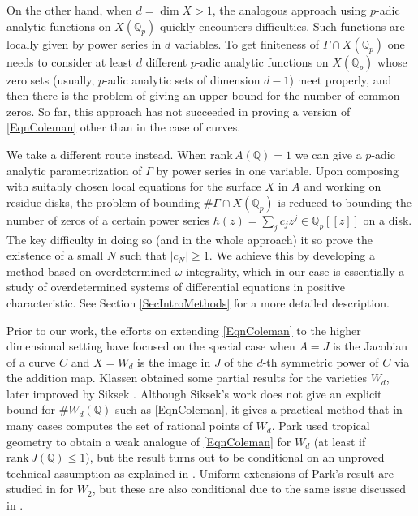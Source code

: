 \documentclass[11pt]{amsart}
\theoremstyle{remark}
\numberwithin{equation}{section}
\newcommand{\Q}{\mathbb{Q}}
\newcommand{\rk}{\mathrm{rank}\,}
\begin{document}
On the other hand, when $d=\dim X>1$, the analogous approach using $p$-adic analytic functions on $X(\Q_p)$ quickly encounters difficulties. Such functions are locally given by power series in $d$ variables. To get finiteness of $\Gamma\cap X(\Q_p)$ one needs to consider at least $d$ different $p$-adic analytic functions on $X(\Q_p)$ whose zero sets (usually, $p$-adic analytic sets of dimension $d-1$) meet properly, and then there is the problem of giving an upper bound for the number of common zeros. So far, this approach has not succeeded in proving a version of \eqref{EqnColeman} other than in the case of curves.

We take a different route instead. When $\rk A(\Q)=1$ we can give a $p$-adic analytic parametrization of $\Gamma$ by power series in one variable. Upon composing with suitably chosen local equations for the surface $X$ in $A$ and working on residue disks, the problem of bounding $\# \Gamma\cap X(\Q_p)$ is reduced to bounding the number of zeros of a certain power series $h(z)=\sum_j c_jz^j\in \Q_p[[z]]$ on a disk. The key difficulty in doing so (and in the whole approach) it so prove the existence of a small $N$ such that $|c_N|\ge 1$.  We achieve this by developing a method based on overdetermined $\omega$-integrality, which in our case is essentially a study of overdetermined systems of differential equations in positive characteristic. See Section \ref{SecIntroMethods} for a more detailed description.






Prior to our work, the efforts on extending \eqref{EqnColeman} to the higher dimensional setting  have focused on the special case when $A=J$ is the Jacobian of a curve $C$  and $X=W_d$ is the image in $J$ of the $d$-th symmetric power of $C$ via the addition map.  Klassen \cite{Klassen} obtained some partial results for the varieties $W_d$, later improved by Siksek \cite{Siksek}. Although Siksek's work does not give an explicit  bound for $\# W_d(\Q)$ such as \eqref{EqnColeman}, it gives a practical method that in many cases computes the set of rational points of $W_d$.  Park \cite{Park} used tropical geometry to obtain a weak analogue of \eqref{EqnColeman} for $W_d$ (at least if $\rk J(\Q)\le 1$),  but the result turns out to be conditional on an unproved technical assumption as explained in \cite{GM}. Uniform extensions of Park's result are studied in \cite{VW} for $W_2$, but these are also conditional due to the same issue discussed in \cite{GM}.
\end{document}
